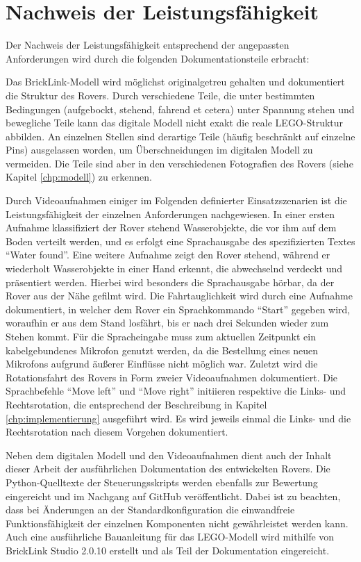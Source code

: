 \chapter{Nachweis der Leistungsfähigkeit}
\label{chp:nachweis_leistungsfaehigkeit}

Der Nachweis der Leistungsfähigkeit entsprechend der angepassten Anforderungen wird durch die folgenden Dokumentationsteile erbracht:

Das BrickLink-Modell wird möglichst originalgetreu gehalten und dokumentiert die Struktur des Rovers.
Durch verschiedene Teile, die unter bestimmten Bedingungen (aufgebockt, stehend, fahrend et cetera) unter Spannung stehen und bewegliche Teile kann das digitale Modell nicht exakt die reale LEGO-Struktur abbilden.
An einzelnen Stellen sind derartige Teile (häufig beschränkt auf einzelne Pins) ausgelassen worden, um Überschneidungen im digitalen Modell zu vermeiden.
Die Teile sind aber in den verschiedenen Fotografien des Rovers (siehe Kapitel \ref{chp:modell}) zu erkennen.

Durch Videoaufnahmen einiger im Folgenden definierter Einsatzszenarien ist die Leistungsfähigkeit der einzelnen Anforderungen nachgewiesen.
In einer ersten Aufnahme klassifiziert der Rover stehend Wasserobjekte, die vor ihm auf dem Boden verteilt werden, und es erfolgt eine Sprachausgabe des spezifizierten Textes \enquote{Water found}.
Eine weitere Aufnahme zeigt den Rover stehend, während er wiederholt Wasserobjekte in einer Hand erkennt, die abwechselnd verdeckt und präsentiert werden.
Hierbei wird besonders die Sprachausgabe hörbar, da der Rover aus der Nähe gefilmt wird.
Die Fahrtauglichkeit wird durch eine Aufnahme dokumentiert, in welcher dem Rover ein Sprachkommando \enquote{Start} gegeben wird, woraufhin er aus dem Stand losfährt, bis er nach drei Sekunden wieder zum Stehen kommt.
Für die Spracheingabe muss zum aktuellen Zeitpunkt ein kabelgebundenes Mikrofon genutzt werden, da die Bestellung eines neuen Mikrofons aufgrund äußerer Einflüsse nicht möglich war.
Zuletzt wird die Rotationsfahrt des Rovers in Form zweier Videoaufnahmen dokumentiert.
Die Sprachbefehle \enquote{Move left} und \enquote{Move right} initiieren respektive die Links- und Rechtsrotation, die entsprechend der Beschreibung in Kapitel \ref{chp:implementierung} ausgeführt wird.
Es wird jeweils einmal die Links- und die Rechtsrotation nach diesem Vorgehen dokumentiert.

Neben dem digitalen Modell und den Videoaufnahmen dient auch der Inhalt dieser Arbeit der ausführlichen Dokumentation des entwickelten Rovers.
Die Python-Quelltexte der Steuerungsskripts werden ebenfalls zur Bewertung eingereicht und im Nachgang auf GitHub veröffentlicht.
Dabei ist zu beachten, dass bei Änderungen an der Standardkonfiguration die einwandfreie Funktionsfähigkeit der einzelnen Komponenten nicht gewährleistet werden kann.
Auch eine ausführliche Bauanleitung für das LEGO-Modell wird mithilfe von BrickLink Studio 2.0.10 erstellt und als Teil der Dokumentation eingereicht.